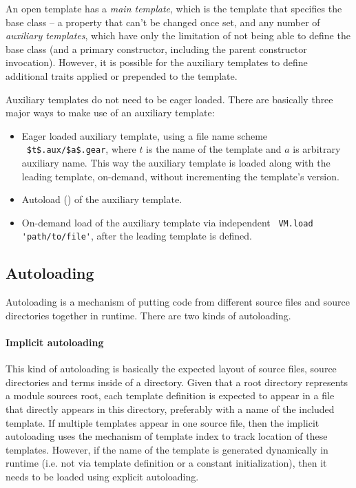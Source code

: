 An open template has a {\em main template}, which is the template that specifies the base class -- a property that can't be changed once set, and any number of {\em auxiliary templates}, which have only the limitation of not being able to define the base class (and a primary constructor, including the parent constructor invocation). However, it is possible for the auxiliary templates to define additional traits applied or prepended to the template. 

Auxiliary templates do not need to be eager loaded. There are basically three major ways to make use of an auxiliary template:
\begin{itemize}
  \item Eager loaded auxiliary template, using a file name scheme ~\lstinline!$t$.aux/$a$.gear!, where $t$ is the name of the template and $a$ is arbitrary auxiliary name. This way the auxiliary template is loaded along with the leading template, on-demand, without incrementing the template's version.
  \item Autoload () of the auxiliary template. 
  \item On-demand load of the auxiliary template via independent ~\lstinline[deletekeywords={to}]!VM.load 'path/to/file'!, after the leading template is defined.
\end{itemize}





\subsection{Autoloading}
\label{sec:autoloading}

Autoloading is a mechanism of putting code from different source files and source directories together in runtime. There are two kinds of autoloading.

\paragraph{Implicit autoloading}
This kind of autoloading is basically the expected layout of source files, source directories and terms inside of a directory. Given that a root directory represents a module sources root, each template definition is expected to appear in a file that directly appears in this directory, preferably with a name of the included template. If multiple templates appear in one source file, then the implicit autoloading uses the mechanism of template index to track location of these templates. However, if the name of the template is generated dynamically in runtime (i.e. not via template definition or a constant initialization), then it needs to be loaded using explicit autoloading. 

